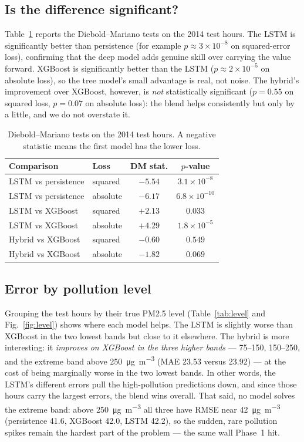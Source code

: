 \documentclass[onecolumn,11pt,journal]{IEEEtran}
\newcommand{\ugm}{\si{\micro\gram\per\cubic\metre}}
\begin{document}
\subsection{Is the difference significant?}
Table~\ref{tab:dm} reports the Diebold--Mariano tests on the 2014 test hours. The LSTM is significantly better than persistence (for example $p \approx 3\times10^{-8}$ on squared-error loss), confirming that the deep model adds genuine skill over carrying the value forward. XGBoost is significantly better than the LSTM ($p \approx 2\times10^{-5}$ on absolute loss), so the tree model's small advantage is real, not noise. The hybrid's improvement over XGBoost, however, is \emph{not} statistically significant ($p = 0.55$ on squared loss, $p = 0.07$ on absolute loss): the blend helps consistently but only by a little, and we do not overstate it.

\begin{table}[t]
\centering
\caption{Diebold--Mariano tests on the 2014 test hours. A negative statistic means the first model has the lower loss.}
\label{tab:dm}
\setlength{\tabcolsep}{7pt}
\begin{tabular}{llcc}
\toprule
Comparison & Loss & DM stat. & $p$-value \\
\midrule
LSTM vs persistence & squared  & $-5.54$ & $3.1\times10^{-8}$ \\
LSTM vs persistence & absolute & $-6.17$ & $6.8\times10^{-10}$ \\
LSTM vs XGBoost     & squared  & $+2.13$ & $0.033$ \\
LSTM vs XGBoost     & absolute & $+4.29$ & $1.8\times10^{-5}$ \\
Hybrid vs XGBoost   & squared  & $-0.60$ & $0.549$ \\
Hybrid vs XGBoost   & absolute & $-1.82$ & $0.069$ \\
\bottomrule
\end{tabular}
\end{table}

\subsection{Error by pollution level}
Grouping the test hours by their true PM2.5 level (Table~\ref{tab:level} and Fig.~\ref{fig:level}) shows where each model helps. The LSTM is slightly worse than XGBoost in the two lowest bands but close to it elsewhere. The hybrid is more interesting: it \emph{improves on XGBoost in the three higher bands} --- 75--150, 150--250, and the extreme band above 250~\ugm{} (MAE 23.53 versus 23.92) --- at the cost of being marginally worse in the two lowest bands. In other words, the LSTM's different errors pull the high-pollution predictions down, and since those hours carry the largest errors, the blend wins overall. That said, no model solves the extreme band: above 250~\ugm{} all three have RMSE near 42~\ugm{} (persistence 41.6, XGBoost 42.0, LSTM 42.2), so the sudden, rare pollution spikes remain the hardest part of the problem --- the same wall Phase~1 hit.
\end{document}
